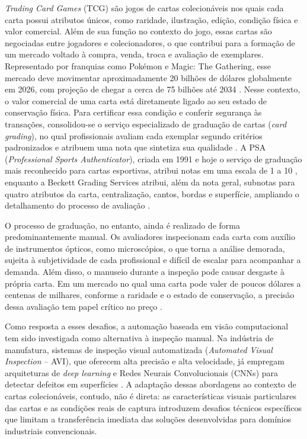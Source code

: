 \documentclass[
    12pt,                %
    openright,           %
    oneside,             %
    a4paper,             %
    english,             %
    brazil               %
]{abntex2}
\begin{document}
\textit{Trading Card Games} (TCG) são jogos de cartas colecionáveis nos quais
cada carta possui atributos únicos, como raridade, ilustração, edição, 
condição física e valor comercial. Além de sua função no contexto do 
jogo, essas cartas são negociadas entre jogadores e colecionadores, 
o que contribui para a formação de um mercado voltado à compra, venda, 
troca e avaliação de exemplares.
Representado por franquias como Pokémon e Magic: The 
Gathering, esse mercado deve movimentar aproximadamente 20 bilhões de 
dólares globalmente em 2026, com projeção de chegar a cerca de 75 bilhões
até 2034 \cite{BRI2026}. Nesse contexto, o valor comercial de uma carta 
está diretamente ligado ao seu estado de conservação física. Para 
certificar essa condição e conferir segurança às transações, 
consolidou-se o serviço especializado de graduação de cartas 
(\textit{card grading}), no qual profissionais avaliam cada exemplar 
segundo critérios padronizados e atribuem uma nota que sintetiza sua 
qualidade \cite{Nahar2025}. A PSA (\textit{Professional Sports
Authenticator}), criada em 1991 e hoje o serviço de graduação mais
reconhecido para cartas esportivas, atribui notas em uma escala de 1 a
10 \cite{Langelett2025}, enquanto
a Beckett Grading Services atribui, além da nota geral, subnotas para
quatro atributos da carta, centralização, cantos, bordas e superfície,
ampliando o detalhamento do processo de avaliação \cite{Beckett_Standards}.

O processo de graduação, no entanto, ainda é realizado de forma
predominantemente manual. Os avaliadores inspecionam cada carta com
auxílio de instrumentos ópticos, como microscópios, o que torna a
análise demorada, sujeita à subjetividade de cada profissional e
difícil de escalar para acompanhar a demanda. Além disso, o manuseio
durante a inspeção pode causar desgaste à própria carta. Em um mercado
no qual uma carta pode valer de poucos dólares a centenas de milhares,
conforme a raridade e o estado de conservação, a precisão dessa
avaliação tem papel crítico no preço \cite{Nahar2025, Nahar2025b}.

Como resposta a esses desafios, a automação baseada em visão 
computacional tem sido investigada como alternativa à inspeção manual. 
Na indústria de manufatura, sistemas de inspeção visual automatizada 
(\textit{Automated Visual Inspection} -- AVI), que oferecem alta precisão
e alta velocidade, já empregam arquiteturas de \textit{deep learning} e
Redes Neurais Convolucionais (CNNs) para detectar defeitos em superfícies
\cite{Zheng2021}. A adaptação dessas abordagens ao contexto de cartas 
colecionáveis, contudo, não é direta: as características visuais 
particulares das cartas e as condições reais de captura introduzem 
desafios técnicos específicos que limitam a transferência imediata 
das soluções desenvolvidas para domínios industriais convencionais.
\end{document}
